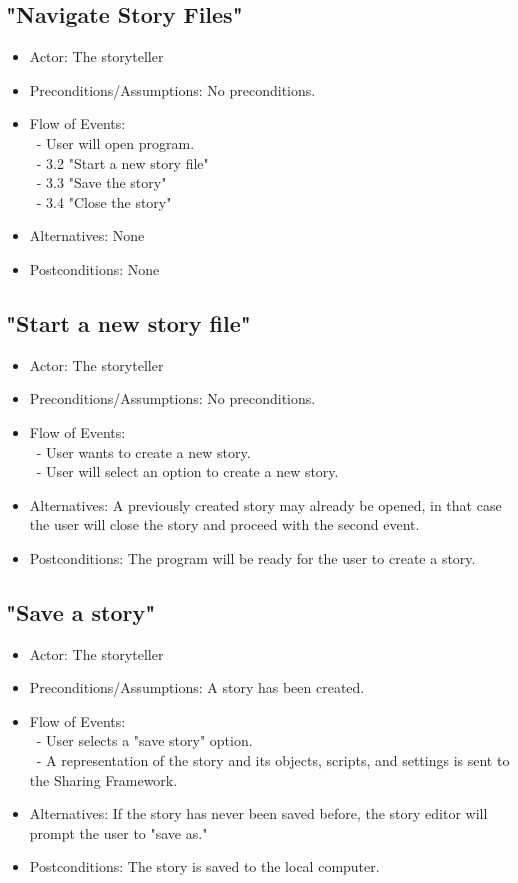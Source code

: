 \documentclass[12pt]{article}
\begin{document}
\subsection{"Navigate Story Files"}
\begin{itemize}
	\item Actor: The storyteller 
	\item Preconditions/Assumptions: No preconditions.
	\item Flow of Events: \\
	 	\ - User will open program. \\
		\ - 3.2 "Start a new story file" \\
		\ - 3.3 "Save the story" \\
		\ - 3.4 "Close the story"
	\item Alternatives: None
	\item Postconditions: None
\end{itemize}

	\subsection{"Start a new story file"}
\begin{itemize}
	\item Actor: The storyteller 
	\item Preconditions/Assumptions: No preconditions.
	\item Flow of Events: \\
		\ - User wants to create a new story. \\
		\ - User will select an option to create a new story.
	
	\item Alternatives: A previously created story may already be opened, in that case the user will close the story and proceed with the second event.
	\item Postconditions: The program will be ready for the user to create a story.
\end{itemize}

		\subsection{"Save a story"}
\begin{itemize}
	\item Actor: The storyteller 
		\item Preconditions/Assumptions: A story has been created.
	\item Flow of Events: \\
	\	- User selects a "save story" option. \\
	\	- A representation of the story and its objects, scripts, and settings is sent to the Sharing Framework.
	\item Alternatives: If the story has never been saved before, the story editor will prompt
	the user to "save as."
	\item Postconditions: The story is saved to the local computer.
\end{itemize}
	
\end{document}
